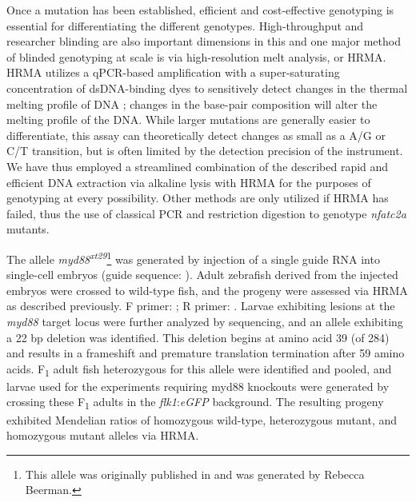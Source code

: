 Once a mutation has been established, efficient and cost\hyp{}effective genotyping is essential for differentiating the different genotypes. High\hyp{}throughput and researcher blinding are also important dimensions in this and one major method of blinded genotyping at scale is via high\hyp{}resolution melt analysis, or HRMA. HRMA utilizes a qPCR\hyp{}based amplification with a super\hyp{}saturating concentration of dsDNA\hyp{}binding dyes to sensitively detect changes in the thermal melting profile of DNA \citep{Reed2007, Thomas2014}; changes in the base\hyp{}pair composition will alter the melting profile of the DNA. While larger mutations are generally easier to differentiate, this assay can theoretically detect changes as small as a A/G or C/T transition, but is often limited by the detection precision of the instrument. We have thus employed a streamlined combination of the described rapid and efficient DNA extraction via alkaline lysis \citep{Meeker2007} with HRMA for the purposes of genotyping at every possibility. Other methods are only utilized if HRMA has failed, thus the use of classical PCR and restriction digestion to genotype \textit{nfatc2a} mutants.

The allele \textit{myd88\textsuperscript{xt29}}\footnote{This allele was originally published in  and was generated by Rebecca Beerman.} was generated by injection of a single guide RNA into single\hyp{}cell embryos (guide sequence: ). Adult zebrafish derived from the injected embryos were crossed to wild\hyp{}type fish, and the progeny were assessed via HRMA as described previously. F primer: ; R primer: . Larvae exhibiting lesions at the \textit{myd88} target locus were further analyzed by sequencing, and an allele exhibiting a 22 bp deletion was identified. This deletion begins at amino acid 39 (of 284) and results in a frameshift and premature translation termination after 59 amino acids. F\textsubscript{1} adult fish heterozygous for this allele were identified and pooled, and larvae used for the experiments requiring myd88 knockouts were generated by crossing these F\textsubscript{1} adults in the \textit{flk1}:\textit{eGFP} background. The resulting progeny exhibited Mendelian ratios of homozygous wild\hyp{}type, heterozygous mutant, and homozygous mutant alleles via HRMA.

